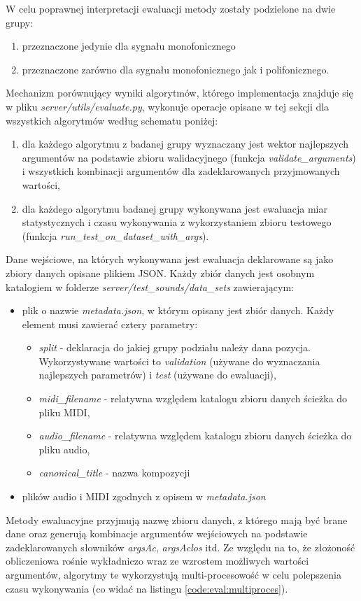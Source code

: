 \documentclass[12pt,a4paper,twoside]{mwart}
\begin{document}
W celu poprawnej interpretacji ewaluacji metody zostały podzielone na dwie grupy:
\begin{enumerate}
  \item przeznaczone jedynie dla sygnału monofonicznego
  \item przeznaczone zarówno dla sygnału monofonicznego jak i polifonicznego.
\end{enumerate}
Mechanizm porównujący wyniki algorytmów, którego implementacja znajduje się w pliku \textit{server/utils/evaluate.py}, wykonuje operacje opisane w tej sekcji dla wszystkich algorytmów według schematu poniżej:
\begin{enumerate}
  \item dla każdego algorytmu z badanej grupy wyznaczany jest wektor najlepszych argumentów na podstawie zbioru walidacyjnego (funkcja \textit{validate\_arguments}) i wszystkich kombinacji argumentów dla zadeklarowanych przyjmowanych wartości,
  \item dla każdego algorytmu badanej grupy wykonywana jest ewaluacja miar statystycznych i czasu wykonywania z wykorzystaniem zbioru testowego (funkcja \textit{run\_test\_on\_dataset\_with\_args}).
\end{enumerate}
Dane wejściowe, na których wykonywana jest ewaluacja deklarowane są jako zbiory danych opisane plikiem JSON. Każdy zbiór danych jest osobnym katalogiem w folderze \textit{server/test\_sounds/data\_sets} zawierającym:
\begin{itemize}
  \item plik o nazwie \textit{metadata.json}, w którym opisany jest zbiór danych. Każdy element musi zawierać cztery parametry:
  \begin{itemize}
    \item \textit{split} - deklaracja do jakiej grupy podziału należy dana pozycja. Wykorzystywane wartości to \textit{validation} (używane do wyznaczania najlepszych parametrów) i \textit{test} (używane do ewaluacji),
    \item \textit{midi\_filename} - relatywna względem katalogu zbioru danych ścieżka do pliku MIDI,
    \item \textit{audio\_filename} - relatywna względem katalogu zbioru danych ścieżka do pliku audio,
    \item \textit{canonical\_title} - nazwa kompozycji
  \end{itemize}
  \item plików audio i MIDI zgodnych z opisem w \textit{metadata.json}
\end{itemize}
Metody ewaluacyjne przyjmują nazwę zbioru danych, z którego mają być brane dane oraz generują kombinacje argumentów wejściowych na podstawie zadeklarowanych słowników \textit{argsAc}, \textit{argsAclos} itd. Ze względu na to, że złożoność obliczeniowa rośnie wykładniczo wraz ze wzrostem możliwych wartości argumentów, algorytmy te wykorzystują multi-procesowość w celu polepszenia czasu wykonywania (co widać na listingu \ref{code:eval:multiproces}). 
\end{document}
